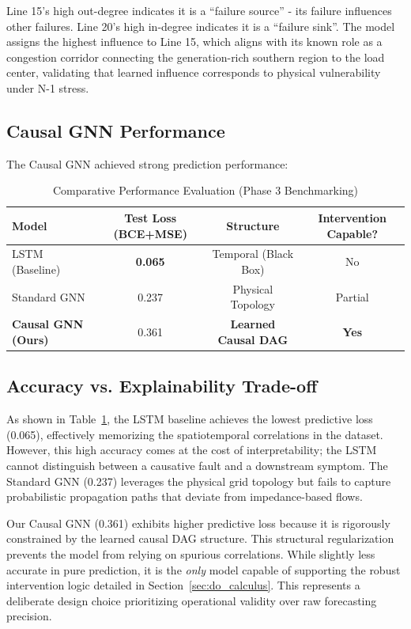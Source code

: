 \documentclass[journal,12pt,onecolumn]{IEEEtran}
\begin{document}
Line 15's high out-degree indicates it is a ``failure source'' - its failure influences other failures. Line 20's high in-degree indicates it is a ``failure sink''. The model assigns the highest influence to Line 15, which aligns with its known role as a congestion corridor connecting the generation-rich southern region to the load center, validating that learned influence corresponds to physical vulnerability under N-1 stress.

\subsection{Causal GNN Performance}

The Causal GNN achieved strong prediction performance:

\begin{table}[htbp]
\caption{Comparative Performance Evaluation (Phase 3 Benchmarking)}
\label{tab:gnn_results}
\centering
\begin{tabular}{lccc}
\toprule
\textbf{Model} & \textbf{Test Loss (BCE+MSE)} & \textbf{Structure} & \textbf{Intervention Capable?} \\
\midrule
LSTM (Baseline) & \textbf{0.065} & Temporal (Black Box) & No \\
Standard GNN & 0.237 & Physical Topology & Partial \\
\textbf{Causal GNN (Ours)} & 0.361 & \textbf{Learned Causal DAG} & \textbf{Yes} \\
\bottomrule
\end{tabular}
\end{table}

\subsection{Accuracy vs. Explainability Trade-off}

As shown in Table~\ref{tab:gnn_results}, the LSTM baseline achieves the lowest predictive loss (0.065), effectively memorizing the spatiotemporal correlations in the dataset. However, this high accuracy comes at the cost of interpretability; the LSTM cannot distinguish between a causative fault and a downstream symptom. The Standard GNN (0.237) leverages the physical grid topology but fails to capture probabilistic propagation paths that deviate from impedance-based flows.

Our Causal GNN (0.361) exhibits higher predictive loss because it is rigorously constrained by the learned causal DAG structure. This structural regularization prevents the model from relying on spurious correlations. While slightly less accurate in pure prediction, it is the \textit{only} model capable of supporting the robust intervention logic detailed in Section~\ref{sec:do_calculus}. This represents a deliberate design choice prioritizing operational validity over raw forecasting precision.
\end{document}

